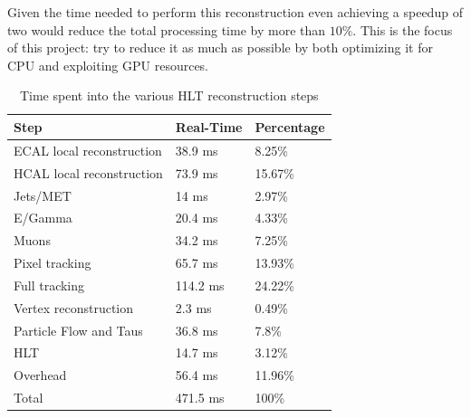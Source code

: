 Given the time needed to perform this reconstruction even achieving a speedup of two would reduce the total processing time by more than $10\%$. This is the focus of this project: try to reduce it as much as possible by both optimizing it for CPU and exploiting GPU resources.
\begin{table}[ht]
  \caption{Time spent into the various HLT reconstruction steps}
  \label{table:timeshare}
  \begin{tabular}{lll}
    \hline
    Step                      & Real-Time      & Percentage \\ \hline
    ECAL local reconstruction & 38.9 ms        & 8.25\%     \\
    HCAL local reconstruction & 73.9 ms        & 15.67\%    \\
    Jets/MET                  & 14 ms          & 2.97\%     \\
    E/Gamma                   & 20.4 ms        & 4.33\%     \\
    Muons                     & 34.2 ms        & 7.25\%     \\
    Pixel tracking            & 65.7 ms        & 13.93\%    \\
    Full tracking             & 114.2 ms       & 24.22\%    \\
    Vertex reconstruction     & 2.3 ms         & 0.49\%     \\
    Particle Flow and Taus    & 36.8 ms        & 7.8\%      \\
    HLT                       & 14.7 ms        & 3.12\%     \\
    Overhead                  & 56.4 ms        & 11.96\%    \\
    Total                     & 471.5 ms       & 100\%      \\ \hline
  \end{tabular}
\end{table}
